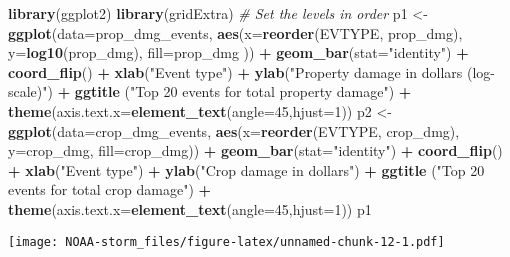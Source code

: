 \documentclass[]{article}
\newenvironment{Shaded}{\begin{snugshade}}{\end{snugshade}}
\newcommand{\KeywordTok}[1]{\textcolor[rgb]{0.13,0.29,0.53}{\textbf{#1}}}
\newcommand{\DataTypeTok}[1]{\textcolor[rgb]{0.13,0.29,0.53}{#1}}
\newcommand{\DecValTok}[1]{\textcolor[rgb]{0.00,0.00,0.81}{#1}}
\newcommand{\StringTok}[1]{\textcolor[rgb]{0.31,0.60,0.02}{#1}}
\newcommand{\CommentTok}[1]{\textcolor[rgb]{0.56,0.35,0.01}{\textit{#1}}}
\newcommand{\OperatorTok}[1]{\textcolor[rgb]{0.81,0.36,0.00}{\textbf{#1}}}
\newcommand{\NormalTok}[1]{#1}
\begin{document}
\begin{Shaded}
\begin{Highlighting}[]
\KeywordTok{library}\NormalTok{(ggplot2)}
\KeywordTok{library}\NormalTok{(gridExtra)}
\CommentTok{# Set the levels in order}
\NormalTok{p1 <-}\StringTok{ }\KeywordTok{ggplot}\NormalTok{(}\DataTypeTok{data=}\NormalTok{prop_dmg_events,}
             \KeywordTok{aes}\NormalTok{(}\DataTypeTok{x=}\KeywordTok{reorder}\NormalTok{(EVTYPE, prop_dmg), }\DataTypeTok{y=}\KeywordTok{log10}\NormalTok{(prop_dmg), }\DataTypeTok{fill=}\NormalTok{prop_dmg )) }\OperatorTok{+}
\StringTok{    }\KeywordTok{geom_bar}\NormalTok{(}\DataTypeTok{stat=}\StringTok{"identity"}\NormalTok{) }\OperatorTok{+}
\StringTok{    }\KeywordTok{coord_flip}\NormalTok{() }\OperatorTok{+}
\StringTok{    }\KeywordTok{xlab}\NormalTok{(}\StringTok{"Event type"}\NormalTok{) }\OperatorTok{+}
\StringTok{    }\KeywordTok{ylab}\NormalTok{(}\StringTok{"Property damage in dollars (log-scale)"}\NormalTok{) }\OperatorTok{+}
\StringTok{   }\KeywordTok{ggtitle}\NormalTok{ (}\StringTok{"Top 20 events for total property damage"}\NormalTok{) }\OperatorTok{+}
\StringTok{    }\KeywordTok{theme}\NormalTok{(}\DataTypeTok{axis.text.x=}\KeywordTok{element_text}\NormalTok{(}\DataTypeTok{angle=}\DecValTok{45}\NormalTok{,}\DataTypeTok{hjust=}\DecValTok{1}\NormalTok{))}
\NormalTok{p2 <-}\StringTok{ }\KeywordTok{ggplot}\NormalTok{(}\DataTypeTok{data=}\NormalTok{crop_dmg_events,}
             \KeywordTok{aes}\NormalTok{(}\DataTypeTok{x=}\KeywordTok{reorder}\NormalTok{(EVTYPE, crop_dmg), }\DataTypeTok{y=}\NormalTok{crop_dmg, }\DataTypeTok{fill=}\NormalTok{crop_dmg)) }\OperatorTok{+}
\StringTok{    }\KeywordTok{geom_bar}\NormalTok{(}\DataTypeTok{stat=}\StringTok{"identity"}\NormalTok{) }\OperatorTok{+}
\StringTok{    }\KeywordTok{coord_flip}\NormalTok{() }\OperatorTok{+}\StringTok{ }
\StringTok{    }\KeywordTok{xlab}\NormalTok{(}\StringTok{"Event type"}\NormalTok{) }\OperatorTok{+}
\StringTok{    }\KeywordTok{ylab}\NormalTok{(}\StringTok{"Crop damage in dollars"}\NormalTok{) }\OperatorTok{+}\StringTok{ }
\StringTok{  }\KeywordTok{ggtitle}\NormalTok{ (}\StringTok{"Top 20 events for total crop damage"}\NormalTok{) }\OperatorTok{+}
\StringTok{    }\KeywordTok{theme}\NormalTok{(}\DataTypeTok{axis.text.x=}\KeywordTok{element_text}\NormalTok{(}\DataTypeTok{angle=}\DecValTok{45}\NormalTok{,}\DataTypeTok{hjust=}\DecValTok{1}\NormalTok{))}
\NormalTok{p1}
\end{Highlighting}
\end{Shaded}

\texttt{[image: NOAA-storm\_files/figure-latex/unnamed-chunk-12-1.pdf]}
\end{document}
